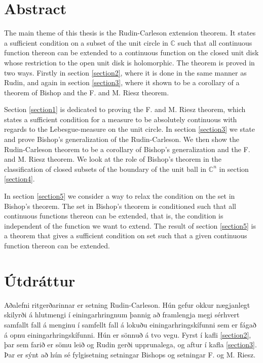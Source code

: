 \documentclass[a4paper,12pt,twoside,BCOR=10mm]{scrbook}
\theoremstyle{definition}
\theoremstyle{definition}
\theoremstyle{definition}
\begin{document}
\setcounter{page}{5}
\section*{\huge Abstract}
The main theme of this thesis is the Rudin-Carleson extension theorem.
It states a sufficient condition on a subset of the unit circle in $\mathbb{C}$ such that all continuous function thereon can be extended to a continuous function on the closed unit disk whose restriction to the open unit disk is holomorphic.
The theorem is proved in two ways.
Firstly in section \ref{section2}, where it is done in the same manner as Rudin, and again in section \ref{section3}, where it shown to be a corollary of a theorem of Bishop and the F. and M. Riesz theorem.

Section \ref{section1} is dedicated to proving the F. and M. Riesz theorem, which states a sufficient condition for a measure to be absolutely continuous with regards to the Lebesgue-measure on the unit circle.
In section \ref{section3} we state and prove Bishop's generalization of the Rudin-Carleson.
We then show the Rudin-Carleson theorem to be a corollary of Bishop's generalization and the F. and M. Riesz theorem.
We look at the role of Bishop's theorem in the classification of closed subsets of the boundary of the unit ball in $\mathbb{C}^n$ in section \ref{section4}.

In section \ref{section5} we consider a way to relax the condition on the set in Bishop's theorem.
The set in Bishop's theorem is conditioned such that all continuous functions thereon can be extended, that is, the condition is independent of the function we want to extend.
The result of section \ref{section5} is a theorem that gives a sufficient condition on set such that a given continuous function thereon can be extended.


\vfill \vspace*{1cm}
\section*{\huge Útdráttur}
Aðalefni ritgerðarinnar er setning Rudin-Carleson.
Hún gefur okkur nægjanlegt skilyrði á hlutmengi í einingarhringnum þannig að framlengja megi sérhvert samfallt fall á menginu í samfellt fall á lokuðu einingarhringskífunni sem er fágað á opnu einingarhringskífunni.
Hún er sönnuð á tvo vegu.
Fyrst í kafli \ref{section2}, þar sem farið er sömu leið og Rudin gerði upprunalega, og aftur í kafla \ref{section3}.
Þar er sýnt að hún sé fylgisetning setningar Bishops og setningar F. og M. Riesz.
\end{document}
